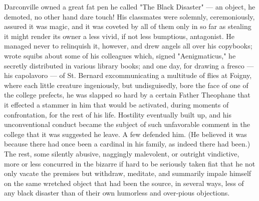   Darconville owned a great fat pen he called "The Black Disaster" --- an object,
he demoted, no other hand dare touch! His classmates were solemnly,
ceremoniously, assured it was magic, and it was coveted by all of them only in
so far as stealing it might render its owner a less vivid, if not less
bumptious, 
antagonist. He managed never to relinquish 
it, however, and drew angels all over his copybooks; wrote squibs 
about some of his colleagues which,
signed "Aenigmaticus," he secretly distributed in various library books; and one
day, for drawing a fresco --- his capolavoro
--- of St. Bernard excommunicating a
multitude of flies at Foigny, where each little creature ingeniously, 
but undisguisedly, bore the face of one of the college prefects, 
he was slapped so
hard by a certain Father Theophane that it effected a stammer in him that would
be activated, during moments of confrontation, for the rest of his life.
Hostility eventually built up, and his unconventional conduct became the subject
of such unfavorable comment in the college that it was suggested he leave. A few
defended him. (He believed it was because there had once been a cardinal in his
family, as indeed there had been.) The rest, some silently abusive, naggingly
malevolent, or outright vindictive, more or less concurred in the bizarre if
hard to be seriously taken fiat 
that he not only vacate the premises but withdraw, meditate, and 
summarily impale 
himself on the same wretched object
that had been the source, in several ways, less of any black disaster than of
their own humorless and over-pious 
objections.

